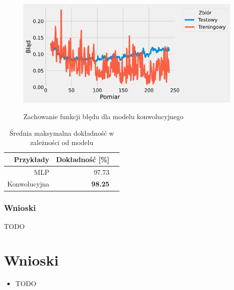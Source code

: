 \documentclass{article}
\begin{document}
\begin{figure}[H]
	\centering
	\caption{Zachowanie funkcji błędu dla modelu konwolucyjnego}
	\includegraphics[width=\textwidth]{con_err.png}
	\label{fig:res24}
\end{figure}

\begin{table}[H]
	\caption{Średnia maksymalna dokładność w zależności od modelu}
	\label{tabela-res-21}
	\centering
	\begin{tabular}{rrr}
		\toprule
		Przykłady   & Dokładność [\%] \\
		\midrule
		MLP          & 97.73              \\
		Konwolucyjna & \textbf{98.25}     \\
		\bottomrule
	\end{tabular}
\end{table}

\subsubsection*{Wnioski}

TODO

\newpage
\section{Wnioski}

\begin{itemize}
	\item TODO
\end{itemize}
\end{document}
